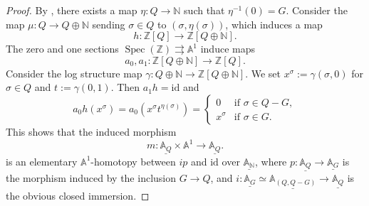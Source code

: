 \documentclass[10pt]{amsart}
\theoremstyle{definition}
\theoremstyle{remark}
\numberwithin{equation}{subsection}
\newcommand{\A}{\mathbb{A}}
\newcommand{\N}{\mathbb{N}}
\newcommand{\Z}{\mathbb{Z}}
\DeclareMathOperator{\Spec}{Spec}
\newcommand{\id}{\mathrm{id}}
\newcommand{\ul}{\underline}
\begin{document}
\begin{proof}
By \cite[Proposition I.2.2.1]{Ogu}, there exists a map $\eta\colon Q\to \N$ such that $\eta^{-1}(0)=G$.
Consider the map $\mu\colon Q\to Q\oplus \N$ sending $\sigma\in Q$ to $(\sigma,\eta(\sigma))$, which induces a map
\[
h\colon \Z[Q]\to \Z[Q\oplus \N].
\]
The zero and one sections $\Spec(\Z)\rightrightarrows \A^1$ induce maps
\[
a_0,a_1\colon \Z[Q\oplus \N]
\to
\Z[Q].
\]
Consider the log structure map $\gamma\colon Q\oplus \N \to \Z[Q\oplus \N]$.
We set $x^\sigma:=\gamma(\sigma,0)$ for $\sigma\in Q$ and $t:=\gamma(0,1)$.
Then $a_1h=\id$ and
\[
a_0 h(x^\sigma)=a_0(x^\sigma t^{\eta(\sigma)})
=
\left\{
\begin{array}{ll}
0 & \text{if }\sigma\in Q-G,
\\
x^\sigma & \text{if }\sigma\in G.
\end{array}
\right.
\]
This shows that the induced morphism
\[
m\colon \ul{\A_Q}\times \A^1\to \ul{\A_Q}.
\]
is an elementary $\A^1$-homotopy between $ip$ and $\id$ over $\ul{\A_\N}$, where $p\colon \ul{\A_Q}\to \ul{\A_{G}}$ is the morphism induced by the inclusion $G\to Q$, and $i\colon \ul{\A_G}\simeq \ul{\A_{(Q,Q-G)}}\to \ul{\A_Q}$ is the obvious closed immersion.





\end{proof}
\end{document}

